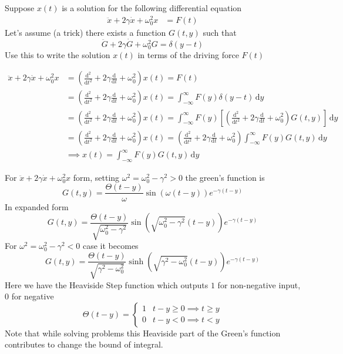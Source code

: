 \documentclass[10pt]{article}
\begin{document}
\begin{prob}
	Suppose $x(t)$ is a solution for the following differential equation 
	\begin{align*}
		\ddot{x} + 2\gamma \dot{x} + \omega_0^2 x &=  F(t)
	\end{align*}
Let's assume (a trick) there exists a function $G(t,y)$ such that 
\[
		\ddot{G} + 2\gamma \dot{G} + \omega_0^2 G =  \delta(y -t )
\] 
Use this to write the solution $x(t)$ in terms of the driving force $F(t)$
\end{prob}
\begin{solu}
	\begin{align*}
		\ddot{x} + 2 \gamma \dot{x} + \omega_0^2 x &= 
		\left(
\frac{\mathrm{d} ^2}{\mathrm{d} t^2} + 2 \gamma \frac{\mathrm{d} }{\mathrm{d} t} + \omega_0^2 
		\right)
		x(t) = F(t) \\
		&=  
		\left(
\frac{\mathrm{d} ^2}{\mathrm{d} t^2} + 2 \gamma \frac{\mathrm{d} }{\mathrm{d} t} + \omega_0^2 
		\right)
		x(t) = \int_{-\infty}^{\infty} F(y) \delta(y - t)\, \mathrm{d} y  \\
		&=  
		\left(
\frac{\mathrm{d} ^2}{\mathrm{d} t^2} + 2 \gamma \frac{\mathrm{d} }{\mathrm{d} t} + \omega_0^2 
		\right)
		x(t) = \int_{-\infty}^{\infty} F(y) 
		\left[\left(
\frac{\mathrm{d} ^2}{\mathrm{d} t^2} + 2 \gamma \frac{\mathrm{d} }{\mathrm{d} t} + \omega_0^2 
\right) G(t,y) \right]
		\, \mathrm{d} y  \\
		&=  
		\left(
\frac{\mathrm{d} ^2}{\mathrm{d} t^2} + 2 \gamma \frac{\mathrm{d} }{\mathrm{d} t} + \omega_0^2 
		\right)
		x(t) =
			\left(
\frac{\mathrm{d} ^2}{\mathrm{d} t^2} + 2 \gamma \frac{\mathrm{d} }{\mathrm{d} t} + \omega_0^2 
\right) 
		\int_{-\infty}^{\infty} F(y) 
G(t,y) 
		\, \mathrm{d} y  \\ &
		\implies x(t) = \int_{-\infty}^{\infty} F(y) G(t,y) \, \mathrm{d} y 
	\end{align*}
\end{solu}
\begin{fact}
For $\ddot{x} + 2 \gamma \dot{x} + \omega_0^2 x$ form, setting $\omega^2 = \omega_0^2 - \gamma^2 > 0$ the green's function is 
\[ G(t,y) = 
\frac{\Theta(t-y)}{\omega} \sin\left(\omega (t - y)\right) e^{- \gamma (t- y)}
\] 
In expanded form 
\[ G(t,y) = 
\frac{\Theta(t-y)}{\sqrt{\omega_0^2 - \gamma^2} } \sin\left(\sqrt{\omega_0^2 - \gamma^2}  (t - y)\right) e^{- \gamma (t- y)}
\] 
For $\omega^2 = \omega_0^2 - \gamma ^2 < 0$ case it becomes 
\[ G(t,y) = 
\frac{\Theta(t-y)}{\sqrt{\gamma^2 - \omega_0^2} } \sinh\left(\sqrt{\gamma^2 - \omega_0^2}  (t - y)\right) e^{- \gamma (t- y)}
\] Here we have the Heaviside Step function which outputs $1$ for non-negative input, 0 for negative
\[\Theta(t-y) = 
\begin{cases}
1 & t - y \ge 0 \implies t \ge y	\\
0 & t - y < 0 \implies t < y
\end{cases}
\] 
Note that while solving problems this Heaviside part of the Green's function contributes to change the bound of integral.
\end{fact}
\end{document}
